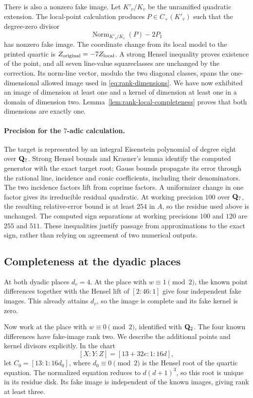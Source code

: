 There is also a nonzero fake image.  Let $K'_v/K_v$ be the unramified
quadratic extension.  The local-point calculation produces
$P\in C_+(K'_v)$ such that the degree-zero divisor
\[
                   \operatorname{Norm}_{K'_v/K_v}(P)-2P_1
\]
has nonzero fake image.  The coordinate change from its local model to
the printed quartic is $Z_{\rm original}=-7Z_{\rm local}$.
A strong Hensel inequality proves existence of the point, and all seven
line-value squareclasses are unchanged by the correction.  Its norm-line
vector, modulo the two diagonal classes, spans the one-dimensional
allowed image used in \eqref{eq:rank-dimensions}.
We have now exhibited an image of dimension at least one and a kernel
of dimension at least one in a domain of dimension two.
Lemma~\ref{lem:rank-local-completeness} proves that both dimensions are
exactly one.

\paragraph{Precision for the $7$-adic calculation.}
The target is represented by an integral Eisenstein polynomial of
degree eight over $\mathbf Q_7$.  Strong Hensel bounds and Krasner's lemma
identify the computed generator with the exact target root; Gauss
bounds propagate its error through the rational line, incidence and
conic coefficients, including their denominators.  The two incidence
factors lift from coprime factors.  A uniformizer change in one factor
gives its irreducible residual quadratic.  At working precision $100$
over $\mathbf Q_7$, the resulting relative-error bound is at least $254$ in
$A$, so the residue used above is unchanged.  The computed sign
separations at working precisions $100$ and $120$ are $255$ and $511$.
These inequalities justify passage from approximations to the exact
sign, rather than relying on agreement of two numerical outputs.

\subsection{Completeness at the dyadic places}

At both dyadic places $d_v=4$.  At the place with $w\equiv1\pmod2$,
the known point differences together with the Hensel lift of
$[2:46:1]$ give four independent fake images.  This already attains
$d_v$, so the image is complete and its fake kernel is zero.

Now work at the place with $w\equiv0\pmod2$, identified with $\mathbf Q_2$.
The four known differences have fake-image rank two.  We describe the
additional points and kernel divisors explicitly.  In the chart
\[
                       [X:Y:Z]=[13+32e:1:16d],
\]
let $C_0=[13:1:16d_0]$, where $d_0\equiv0\pmod2$ is the Hensel
root of the quartic equation.  The normalized equation reduces to
$d(d+1)^3$, so this root is unique in its residue disk.  Its fake image
is independent of the known images, giving rank at least three.

